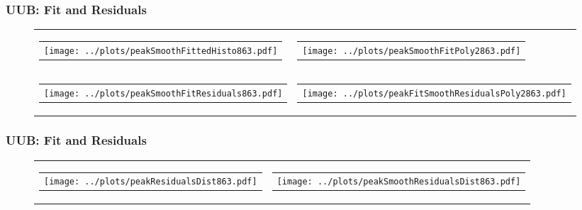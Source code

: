 \documentclass[aspectratio=169]{beamer}
\begin{document}
\begin{frame}
  \frametitle{UUB: Fit and Residuals}
  \begin{figure}
    \centering
    \begin{tabularx}{\textwidth}{CC}
      \begin{tabular}{l}
        \texttt{[image: ../plots/peakSmoothFittedHisto863.pdf]}
      \end{tabular}
      &
      \begin{tabular}{l}
        \texttt{[image: ../plots/peakSmoothFitPoly2863.pdf]}
      \end{tabular}
      \\
      \begin{tabular}{l}
        \texttt{[image: ../plots/peakSmoothFitResiduals863.pdf]}
      \end{tabular}
      &
      \begin{tabular}{l}
        \texttt{[image: ../plots/peakFitSmoothResidualsPoly2863.pdf]}
      \end{tabular}
    \end{tabularx}
  \end{figure}
\end{frame}


\begin{frame}
  \frametitle{UUB: Fit and Residuals}
  \begin{figure}
    \centering
    \begin{tabularx}{\textwidth}{CC}
      \begin{tabular}{l}
        \texttt{[image: ../plots/peakResidualsDist863.pdf]}
      \end{tabular}
      &
      \begin{tabular}{l}
        \texttt{[image: ../plots/peakSmoothResidualsDist863.pdf]}
      \end{tabular}
    \end{tabularx}
  \end{figure}
\end{frame}


\end{document}
